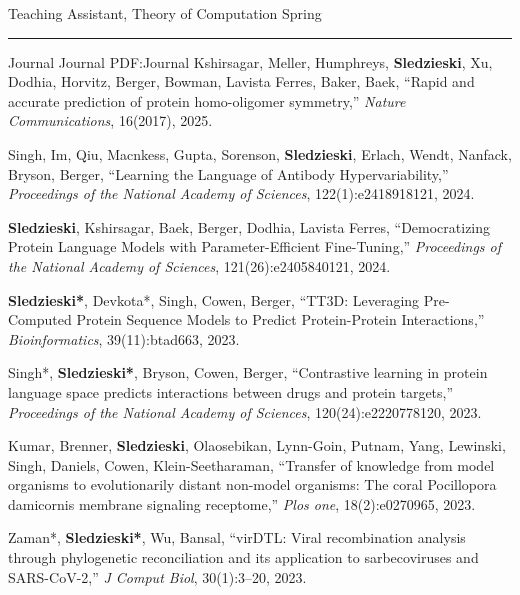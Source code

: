 \documentclass[letterpaper,MMMyyyy,nonstopmode]{simpleresumecv}
\begin{document}
\begin{Body}
\Gap
\Item Teaching Assistant, Theory of Computation
\hfill
Spring 


\BigGap
\hrule
\Section
{Journal}
{Journal}
{PDF:Journal}
\Gap
\NumberedItem{[9]}
{{Kshirsagar, Meller, Humphreys, \textbf{Sledzieski}, Xu, Dodhia, Horvitz, Berger, Bowman, Lavista Ferres, Baker, Baek}, 
``Rapid and accurate prediction of protein homo-oligomer symmetry,'' 
\textit{Nature Communications}, 16(2017), 2025.
}

\Gap
\NumberedItem{[8]}
{{Singh, Im, Qiu, Macnkess, Gupta, Sorenson, \textbf{Sledzieski}, Erlach, Wendt, Nanfack, Bryson, Berger}, 
``Learning the Language of Antibody Hypervariability,'' 
\textit{Proceedings of the National Academy of Sciences}, 122(1):e2418918121, 2024.
}

\Gap
\NumberedItem{[7]}
{{\textbf{Sledzieski}, Kshirsagar, Baek, Berger, Dodhia, Lavista Ferres}, 
``Democratizing Protein Language Models with Parameter-Efficient Fine-Tuning,'' 
\textit{Proceedings of the National Academy of Sciences}, 121(26):e2405840121, 2024.
}

\Gap
\NumberedItem{[6]}
{{\textbf{Sledzieski*}, Devkota*, Singh, Cowen, Berger}, 
``TT3D: Leveraging Pre-Computed Protein Sequence Models to Predict Protein-Protein Interactions,'' 
\textit{Bioinformatics}, 39(11):btad663, 2023.
}

\Gap
\NumberedItem{[5]}
{{Singh*, \textbf{Sledzieski*}, Bryson, Cowen, Berger}, 
``Contrastive learning in protein language space predicts interactions between drugs and protein targets,'' 
\textit{Proceedings of the National Academy of Sciences}, 120(24):e2220778120, 2023.
}

\Gap
\NumberedItem{[4]}
{{Kumar, Brenner, \textbf{Sledzieski}, Olaosebikan, Lynn-Goin, Putnam, Yang, Lewinski, Singh, Daniels, Cowen, Klein-Seetharaman}, 
``Transfer of knowledge from model organisms to evolutionarily distant non-model organisms: The coral Pocillopora damicornis membrane signaling receptome,'' 
\textit{Plos one}, 18(2):e0270965, 2023.
}

\Gap
\NumberedItem{[3]}
{{Zaman*, \textbf{Sledzieski*}, Wu, Bansal}, 
``virDTL: Viral recombination analysis through phylogenetic reconciliation and its application to sarbecoviruses and SARS-CoV-2,'' 
\textit{J Comput Biol}, 30(1):3--20, 2023.
}


\end{Body}
\end{document}
